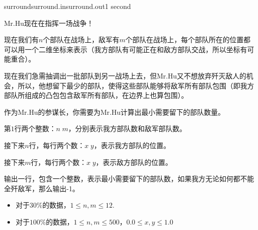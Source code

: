 \documentclass[11pt,a4paper,oneside]{article}
\begin{document}
\begin{problem}{surround}{surround.in}{surround.out}{1 second} 
	
	Mr.Hu现在在指挥一场战争！
	
	现在我们有$n$个部队在战场上，敌军有$m$个部队在战场上，每个部队所在的位置都可以用一个二维坐标来表示（我方部队有可能正在和敌方部队交战，所以坐标有可能重合）。
	
	现在我们急需抽调出一批部队到另一战场上去，但Mr.Hu又不想放弃歼灭敌人的机会，所以，他想留下最少的部队，使得这些部队能够将敌军所有部队包围（即我方部队所组成的凸包包含敌军所有部队，在边界上也算包围）。
	
	作为Mr.Hu的参谋长，你需要为Mr.Hu计算出最小需要留下的部队数量。
	
	\InputFile
	
	第$1$行两个整数：$n \; m$，分别表示我方部队数和敌军部队数。
	
	接下来$n$行，每行两个数：$x \; y$，表示我方部队的位置。
	
	接下来$m$行，每行两个数：$x \; y$，表示敌方部队的位置。
	
	\OutputFile
	
	输出一行，包含一个整数，表示最小需要留下的部队数，如果我方无论如何都不能全歼敌军，那么输出-1。
	
	\Example
	
	\begin{example}
\end{example}

\Note

\begin{itemize}
	\item 对于$30\%$的数据，$1 \leq n, m \leq 12$.
	\item 对于$100\%$的数据，$1 \leq n, m \leq 500$，$0.0 \leq x, y \leq 1.0$
\end{itemize}

\end{problem}
\end{document}
